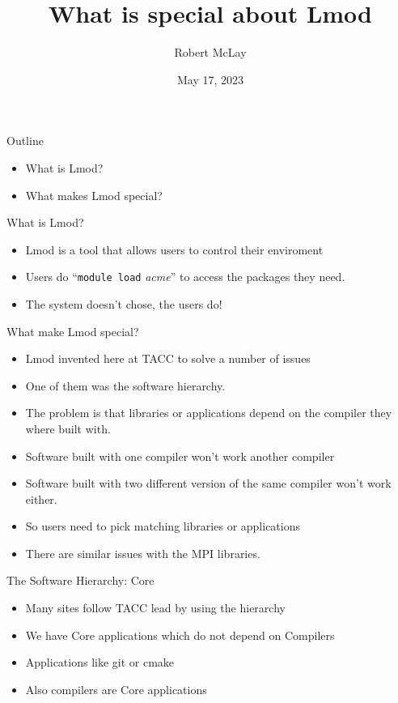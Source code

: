 \documentclass{beamer}
\begin{document}
\title[Lmod]{What is special about Lmod}
\author{Robert McLay} 
\date{May 17, 2023}

\frame{\titlepage} 


\begin{frame}{Outline}
  \begin{itemize}
    \item What is Lmod?
    \item What makes Lmod special?
  \end{itemize}
\end{frame}

\begin{frame}{What is Lmod?}
  \begin{itemize}
    \item Lmod is a tool that allows users to control their enviroment
    \item Users do ``\texttt{module load} \emph{acme}'' to access the
      packages they need.
    \item The system doesn't chose, the users do!
  \end{itemize}
\end{frame}

\begin{frame}{What make Lmod special?}
  \begin{itemize}
    \item Lmod invented here at TACC to solve a number of issues
    \item One of them was the software hierarchy.
    \item The problem is that libraries or applications depend on the
      compiler they where built with.
    \item Software built with one compiler won't work another compiler
    \item Software built with two different version of the same
      compiler won't work either.
    \item So users need to pick matching libraries or applications
    \item There are similar issues with the MPI libraries.
  \end{itemize}
\end{frame}

\begin{frame}{The Software Hierarchy: Core}
    \begin{itemize}
      \item Many sites follow TACC lead by using the hierarchy
      \item We have Core applications which do not depend on Compilers
      \item Applications like git or cmake
      \item Also compilers are Core applications
    \end{itemize}
\end{frame}
\end{document}
